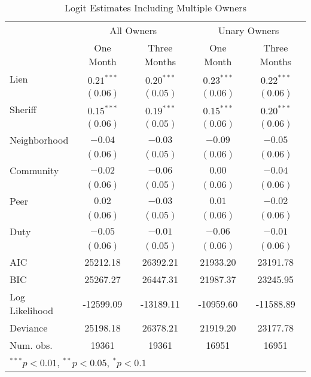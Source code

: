 \begin{table}[htbp]
\caption{Logit Estimates Including Multiple Owners}
\begin{center}
\begin{tabular}{l c c c c }
\hline
 & \multicolumn{2}{c}{All Owners} & \multicolumn{2}{c}{Unary Owners} \\
 & One Month & Three Months & One Month & Three Months \\
\hline
Lien           & $0.21^{***}$ & $0.20^{***}$ & $0.23^{***}$ & $0.22^{***}$ \\
               & $(0.06)$     & $(0.05)$     & $(0.06)$     & $(0.06)$     \\
Sheriff        & $0.15^{***}$ & $0.19^{***}$ & $0.15^{***}$ & $0.20^{***}$ \\
               & $(0.06)$     & $(0.05)$     & $(0.06)$     & $(0.06)$     \\
Neighborhood   & $-0.04$      & $-0.03$      & $-0.09$      & $-0.05$      \\
               & $(0.06)$     & $(0.05)$     & $(0.06)$     & $(0.06)$     \\
Community      & $-0.02$      & $-0.06$      & $0.00$       & $-0.04$      \\
               & $(0.06)$     & $(0.05)$     & $(0.06)$     & $(0.06)$     \\
Peer           & $0.02$       & $-0.03$      & $0.01$       & $-0.02$      \\
               & $(0.06)$     & $(0.05)$     & $(0.06)$     & $(0.06)$     \\
Duty           & $-0.05$      & $-0.01$      & $-0.06$      & $-0.01$      \\
               & $(0.06)$     & $(0.05)$     & $(0.06)$     & $(0.06)$     \\
\hline
AIC            & 25212.18     & 26392.21     & 21933.20     & 23191.78     \\
BIC            & 25267.27     & 26447.31     & 21987.37     & 23245.95     \\
Log Likelihood & -12599.09    & -13189.11    & -10959.60    & -11588.89    \\
Deviance       & 25198.18     & 26378.21     & 21919.20     & 23177.78     \\
Num. obs.      & 19361        & 19361        & 16951        & 16951        \\
\hline
\multicolumn{5}{l}{\scriptsize{$^{***}p<0.01$, $^{**}p<0.05$, $^*p<0.1$}}
\end{tabular}
\label{sh_logit_rob}
\end{center}
\end{table}

